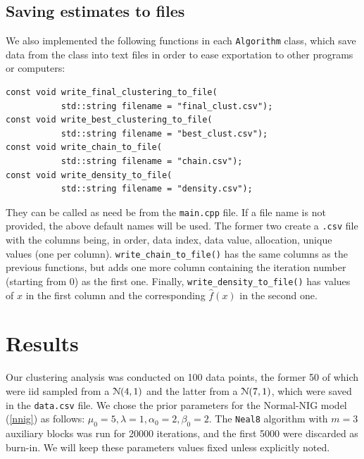 \subsection{Saving estimates to files}
We also implemented the following functions in each \verb|Algorithm| class, which save data from the class into text files in order to ease exportation to other programs or computers:
\begin{verbatim}
const void write_final_clustering_to_file(
           std::string filename = "final_clust.csv");
const void write_best_clustering_to_file(
           std::string filename = "best_clust.csv");
const void write_chain_to_file(
           std::string filename = "chain.csv");
const void write_density_to_file(
           std::string filename = "density.csv");
\end{verbatim}
They can be called as need be from the \verb|main.cpp| file.
If a file name is not provided, the above default names will be used.
The former two create a \verb|.csv| file with the columns being, in order, data index, data value, allocation, unique values (one per column).
\verb|write_chain_to_file()| has the same columns as the previous functions, but adds one more column containing the iteration number (starting from $0$) as the first one.
Finally, \verb|write_density_to_file()| has values of $x$ in the first column and the corresponding $\hat f(x)$ in the second one.

\clearpage

\section{Results}
Our clustering analysis was conducted on 100 data points, the former 50 of which were iid sampled from a $\mathcal N(4,1)$ and the latter from a $\mathcal N(7,1)$, which were saved in the \verb|data.csv| file.
We chose the prior parameters for the Normal-NIG model (\ref{nnig}) as follows: $\mu_0 = 5, \lambda = 1, \alpha_0 = 2, \beta_0 = 2$.
The \verb|Neal8| algorithm with $m=3$ auxiliary blocks was run for 20000 iterations, and the first 5000 were discarded as burn-in.
We will keep these parameters values fixed unless explicitly noted.

